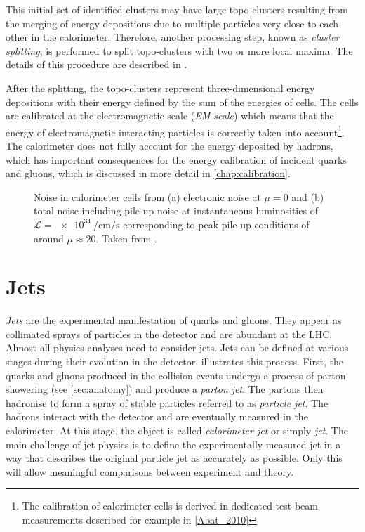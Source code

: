 This initial set of identified clusters may have large topo-clusters resulting from the merging of energy depositions due to multiple particles very close to each other in the calorimeter.
Therefore, another processing step, known as \emph{cluster splitting}, is performed to split topo-clusters with two or more local maxima. The details of this procedure are described in .

After the splitting, the topo-clusters represent three-dimensional energy depositions with their energy defined by the sum of the energies of cells.
The cells are calibrated at the electromagnetic scale (\emph{EM scale}) which means that the energy of electromagnetic interacting particles is correctly taken into account\footnote{The calibration of calorimeter cells is derived in dedicated test-beam measurements described for example in \cref{Abat_2010}}. The calorimeter does not fully account for the energy deposited by hadrons, which has important consequences for the energy calibration of incident quarks and gluons, which is discussed in more detail in \cref{chap:calibration}.


\begin{figure}
        
    \caption{Noise in calorimeter cells from (a) electronic noise at $\mu=0$ and (b) total noise including pile-up noise at instantaneous luminosities of $\mathcal{L} = \SI{e34}{\per\cm\per\s}$ corresponding to peak pile-up conditions of around $\mu\approx20$. Taken from .}
\end{figure}


\section{Jets}
\emph{Jets} are the experimental manifestation of quarks and gluons.
They appear as collimated sprays of particles in the detector and are abundant at the LHC.
Almost all physics analyses need to consider jets. Jets can be defined at various stages during their evolution in the detector.  illustrates this process. First, the quarks and gluons produced in the collision events undergo a process of parton showering (see \cref{sec:anatomy}) and produce a \emph{parton jet}. The partons then hadronise to form a spray of stable particles referred to as \emph{particle jet}. The hadrons interact with the detector and are eventually measured in the calorimeter. At this stage, the object is called \emph{calorimeter jet} or simply \emph{jet}.
The main challenge of jet physics is to define the experimentally measured jet in a way that describes the original particle jet as accurately as possible.
Only this will allow meaningful comparisons between experiment and theory.

